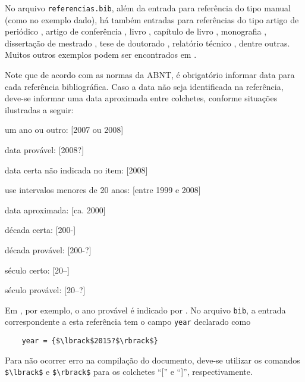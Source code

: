 No arquivo \texttt{referencias.bib}, além da entrada para referência do tipo manual (como no exemplo dado), há também entradas para referências do tipo artigo de periódico \cite{greenwade93}, artigo de conferência \cite{martin1997}, livro \cite{schaum1956}, capítulo de livro \cite{bates2010}, monografia \cite{morgado1990}, dissertação de mestrado \cite{macedo2005}, tese de doutorado \cite{guizzardi2005}, relatório técnico \cite{KrueBansBierDaziRash20}, dentre outras. Muitos outros exemplos podem ser encontrados em \cite{abntex2cite}.

Note que de acordo com as normas da ABNT, é obrigatório informar data para cada referência bibliográfica. Caso a data não seja identificada na referência, deve-se informar uma data aproximada entre colchetes, conforme situações ilustradas a seguir:

\begin{alineas}
    \item um ano ou outro: [2007 ou 2008]
    \item data provável: [2008?]
    \item data certa não indicada no item: [2008]
    \item use intervalos menores de 20 anos: [entre 1999 e 2008]
    \item data aproximada: [ca. 2000]
    \item década certa: [200-]
    \item década provável: [200-?]
    \item século certo: [20--]
    \item século provável: [20--?]
\end{alineas}

Em , por exemplo, o ano provável é indicado por \citeyear{Metodista}. No arquivo \texttt{bib}, a entrada correspondente a esta referência tem o campo \texttt{year} declarado como
\begin{verbatim}
    year = {$\lbrack$2015?$\rbrack$}
\end{verbatim}
Para não ocorrer erro na compilação do documento, deve-se utilizar os comandos \verb|$\lbrack$| e \verb|$\rbrack$| para os colchetes ``['' e ``]'', respectivamente.